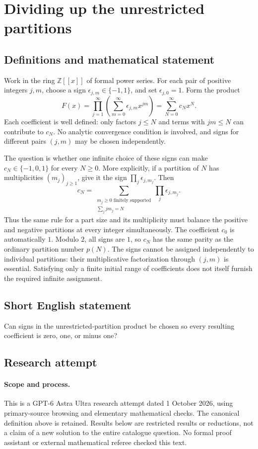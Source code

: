 \documentclass[11pt,a4paper]{article}
\begin{document}
\section*{Dividing up the unrestricted partitions}\label{statement}

\subsection{Definitions and mathematical statement}
Work in the ring $\mathbb Z[[x]]$ of formal power series. For each pair
of positive integers $j,m$, choose a sign $\epsilon_{j,m}\in\{-1,1\}$,
and set $\epsilon_{j,0}=1$. Form the product
\[
 F(x)=\prod_{j=1}^{\infty}\left(\sum_{m=0}^{\infty}
                      \epsilon_{j,m}x^{jm}\right)
      =\sum_{N=0}^{\infty}c_Nx^N.
\]
Each coefficient is well defined: only factors $j\le N$ and terms with
$jm\le N$ can contribute to $c_N$. No analytic convergence condition is
involved, and signs for different pairs $(j,m)$ may be chosen independently.

The question is whether one infinite choice of these signs can make
$c_N\in\{-1,0,1\}$ for every $N\ge0$. More explicitly, if a partition
of $N$ has multiplicities $(m_j)_{j\ge1}$, give it the sign
$\prod_j\epsilon_{j,m_j}$. Then
\[
 c_N=\sum_{\substack{m_j\ge0\text{ finitely supported}\\
                       \sum_jjm_j=N}}\prod_j\epsilon_{j,m_j}.
\]
Thus the same rule for a part size and its multiplicity must balance the
positive and negative partitions at every integer simultaneously. The
coefficient $c_0$ is automatically $1$. Modulo $2$, all signs are $1$, so
$c_N$ has the same parity as the ordinary partition number $p(N)$.
The signs cannot be assigned independently to individual partitions:
their multiplicative factorization through $(j,m)$ is essential. Satisfying
only a finite initial range of coefficients does not itself furnish the
required infinite assignment.
\subsection{Short English statement}
Can signs in the unrestricted-partition product be chosen so every resulting coefficient is zero, one, or minus one?
\subsection{Research attempt}
\paragraph{Scope and process.}
This is a GPT-6 Astra Ultra research attempt dated 1 October 2026, using
primary-source browsing and elementary mathematical checks. The canonical
definition above is retained. Results below are restricted results or
reductions, not a claim of a new solution to the entire catalogue question.
No formal proof assistant or external mathematical referee checked this text.
\end{document}

